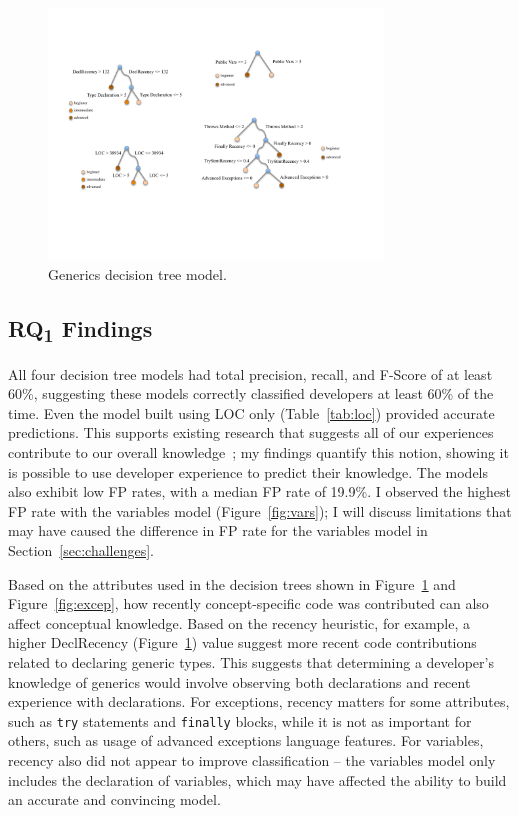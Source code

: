 \begin{figure} [h]
	\centering
	\includegraphics[width=3.5in]{Chapter-6/figs/generics.pdf}
	\caption{Generics decision tree model.}
	\label{fig:gen}
\end{figure}


\subsection{RQ\textsubscript{1} Findings}

All four decision tree models had total precision, recall, and F-Score of at least 60\%, suggesting these models correctly classified developers at least 60\% of the time. Even the model built using LOC only (Table~\ref{tab:loc}) provided accurate predictions. 
This supports existing research that suggests all of our experiences contribute to our overall knowledge~\cite{argote2011organizational}; my findings quantify this notion, showing it is possible to use developer experience to predict their knowledge.
The models also exhibit low FP rates, with a median FP rate of 19.9\%. I observed the highest FP rate with the variables model (Figure~\ref{fig:vars}); I will discuss limitations that may have caused the difference in FP rate for the variables model in Section~\ref{sec:challenges}.

Based on the attributes used in the decision trees shown in Figure~\ref{fig:gen} and Figure~\ref{fig:excep}, how recently concept-specific code was contributed can also affect conceptual knowledge. Based on the recency heuristic, for example, a higher DeclRecency (Figure~\ref{fig:gen}) value suggest more recent code contributions related to declaring generic types. This suggests that determining a developer's knowledge of generics would involve observing both declarations and recent experience with declarations. For exceptions, recency matters for some attributes, such as \texttt{try} statements and \texttt{finally} blocks, while it is not as important for others, such as usage of advanced exceptions language features. For variables, recency also did not appear to improve classification -- the variables model only includes the declaration of variables, which may have affected the ability to build an accurate and convincing model. 

